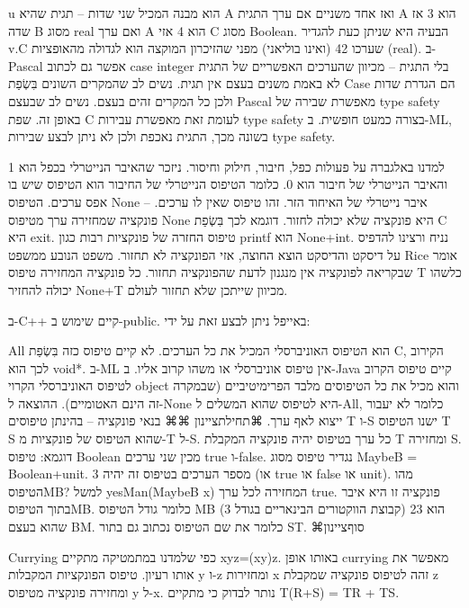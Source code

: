       u הוא מבנה המכיל שני שדות – תגית שהיא A ואז אחד משניים אם ערך התגית A הוא 3 אז שדה B מסוג real ואם ערך A הוא 4 אזי C מסוג Boolean.
      הבעיה היא שניתן כעת להגדיר v.C שערכו 42 (ואינו בוליאני) מפני שהזיכרון המוקצה הוא לגדולה מהאופציות (real).
      ב-Pascal אפשר גם לכתוב case integer בלי התגית – מכיוון שהערכים האפשריים של התגית לא באמת משנים בעצם אין תגית. נשים לב שהמקרים השונים בִּשְׂפַת Case הם הגדרת שדות ולכן כל המקרים זהים בעצם. נשים לב שבעצם Pascal מאפשרת שבירה של type safety באופן זה.
      שפת C לעומת זאת מאפשרת עבירות type safety בצורה כמעט חופשית.
      ב-ML, בשונה מכך, התגית נאכפת ולכן לא ניתן לבצע שבירות type safety.

      למדנו באלגברה על פעולות כפל, חיבור, חילוק וחיסור. ניזכר שהאיבר הנייטרלי בכפל הוא 1 והאיבר הנייטרלי של חיבור הוא 0. כלומר הטיפוס הנייטרלי של החיבור הוא הטיפוס שיש בו אפס ערכים.
      הטיפוס None – איבר נייטרלי של האיחוד הזר. זהו טיפוס שאין לו ערכים. פונקציה שמחזירה ערך מטיפוס None היא פונקציה שלא יכולה לחזור. דוגמא לכך בִּשְׂפַת C היא exit.
      טיפוס החזרה של פונקציות רבות כגון printf הוא None+int. נניח ורצינו להדפיס על דיסקט והדיסקט הוצא החוצה, אזי הפונקציה לא תחזור.
      משפט הנובע ממשפט Rice אומר שבקריאה לפונקציה אין מנגנון לדעת שהפונקציה תחזור. כל פונקציה המחזירה טיפוס T כלשהו יכולה להחזיר None+T מכיוון שייתכן שלא תחזור לעולם.

      ב-C++ קיים שימוש ב-public.
      באייפל ניתן לבצע זאת על ידי:

      All הוא הטיפוס האוניברסלי המכיל את כל הערכים. לא קיים טיפוס כזה בִּשְׂפַת C, הקירוב לכך הוא void*. ב-ML אין טיפוס אוניברסלי או משהו קרוב אליו. ב-Java קיים טיפוס הקרוב לטיפוס האוניברסלי הקרוי object והוא מכיל את כל הטיפוסים מלבד הפרימיטיביים (שבמקרה זה הינם האטומיים).
      ההוצאה ל-None היא לטיפוס שהוא המשלים ל-All, כלומר לא יעבור ייצוא לאף ערך.
      ⌘תחילת{ציינון}
      ⌘⌘ בנאי פונקציה – בהינתן טיפוסים T ו-S ישנו הטיפוס T S שהוא הטיפוס של פונקציות מ-T ל-S. כל ערך בטיפוס יהיה פונקציה המקבלת T ומחזירה S.
      דוגמא:
      טיפוס Boolean מכין שני ערכים true ו-false. נגדיר טיפוס מסוג
      MaybeB = Boolean+unit. מספר הערכים בטיפוס זה יהיה 3 (או true או false או unit).
      מהו הטיפוסMB?
      למשל yesMan(MaybeB x) המחזירה לכל ערך true. פונקציה זו היא איבר בתוך הטיפוסMB.
      כלומר גודל הטיפוס MB הוא 23 (קבוצת הווקטורים הבינאריים בגודל 3) שהוא בעצם BM.
      כלומר את שם הטיפוס נכתוב גם בתור ST.
  ⌘סוף{ציינון}

      Currying
      כפי שלמדנו במתמטיקה מתקיים xyz=(xy)z. באותו אופן currying מאפשר את אותו רעיון. טיפוס הפונקציות המקבלות y ו-z ומחזירות x זהה לטיפוס פונקציה שמקבלת z ומחזירה פונקציה מטיפוס y ל-x.
      נותר לבדוק כי מתקיים T(R+S) = TR + TS.

